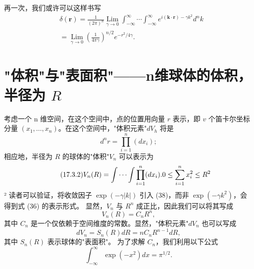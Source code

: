 再一次，我们或许可以这样书写
\begin{equation}\tag{17.2.51}\label{eq:17.2.51}
\begin{array}{rl} & { \delta ( \pmb { r } ) = \frac { 1 } { ( 2 \pi ) ^{n} } \operatorname* { L i m } _ { \gamma \to 0 } \int _ { - \infty } ^{\infty} \cdots \int _ { - \infty } ^{\infty} e ^{i ( \pmb { k} \cdot \pmb { r } ) - \gamma k ^{2} } d ^{n} k } \\& {  = \operatorname* { L i m } _ { \gamma \to 0 } \left( \frac { 1 } { 4 \pi \gamma } \right) ^{n / 2} e ^{- r ^ { 2} / 4 \gamma } . } \end{array}
\end{equation}
\section{\texorpdfstring{"体积"与"表面积"——n维球体的体积，半径为 \(R\)}{"体积"与"表面积"——n维球体的体积，半径为 R}}\label{c-ux4f53ux79efux4e0eux8868ux9762ux79efnux7ef4ux7403ux4f53ux7684ux4f53ux79efux534aux5f84ux4e3a-r}
考虑一个 n 维空间，在这个空间中，点的位置用向量 \(r\) 表示，即 \(v\) 个笛卡尔坐标分量 \((x_1,\ldots,x_n)\)。在这个空间中，"体积元素"\(dV_h\) 将是
\begin{equation}\tag{17.3.1}\label{eq:17.3.1}
d ^{n} r = \prod _ { i = 1 } ^{n} ( d x _ { i } ) ;
\end{equation}
相应地，半径为 \(R\) 的球体的"体积"\(V_{n}\) 可以表示为
\begin{equation}\tag{17.3.2}\label{eq:17.3.2}
V_{n}(R)=\int\cdots\int\prod_{i=1}^{n}(dx_{i}).\\0\leq\sum_{i=1}^{n}x_{i}^{2}\leq R^{2}
\end{equation}
² 读者可以验证，将收敛因子 \(\exp(-\gamma|k|)\) 引入 (38)，而非 \(\exp(-\gamma k^{2})\)，会得到式 (36) 的表示形式。
显然，\(V_{n}\) 与 \(R^{n}\) 成正比，因此我们可以将其写成
\begin{equation}\tag{17.3.3}\label{eq:17.3.3}
V _ { n } ( R ) = C _ { n } R ^{n} ,
\end{equation}
其中 \(C_{n}\) 是一个仅依赖于空间维度的常数。显然，"体积元素"\(dV_{n}\) 也可以写成
\begin{equation}\tag{17.3.4}\label{eq:17.3.4}
d V _ { n } = S _ { n } ( R ) d R = n C _ { n } R ^{n - 1} d R ,
\end{equation}
其中 \(S_{n}(R)\) 表示球体的"表面积"。
为了求解 \(C_{n}\)，我们利用以下公式
\begin{equation}\tag{17.3.5}\label{eq:17.3.5}
\int _ { - \infty } ^{\infty} \exp ( - x ^{2} ) d x = \pi ^{1 / 2} .
\end{equation}
